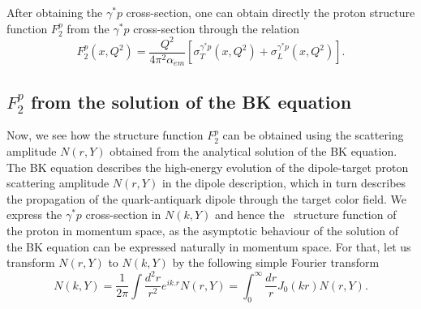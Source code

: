 \documentclass[12pt]{article}
\begin{document}
After obtaining the $\gamma^{\ast}p$ cross-section, one can obtain directly the proton structure function $F_2 ^p$ from the $\gamma^{\ast}p$ cross-section through the relation
\begin{equation}
	F_2 ^p (x,Q^2) = \frac{Q^2}{4 \pi^2 \alpha_{em}} \left[\sigma^{\gamma^{\ast}p} _T (x, Q^2) + \sigma^{\gamma^{\ast}p} _L (x, Q^2)\right].
\end{equation}

\subsection{$F_2 ^p$ from the solution of the BK equation}
Now, we see how the structure function $F_2 ^ p$ can be obtained using the scattering amplitude $N(r,Y)$ obtained from the analytical solution of the BK equation. The BK equation describes the high-energy evolution of the dipole-target proton scattering amplitude $N(r,Y)$ in the dipole description, which in turn describes the propagation of the quark-antiquark dipole through the target color field. We express the $\gamma^{\ast}p$ cross-section in $N(k,Y)$ and hence the  structure function of the proton in momentum space, as the asymptotic behaviour of the solution of the BK equation can be expressed naturally in momentum space. For that, let us transform $N(r,Y)$ to $N(k,Y)$ by the following simple Fourier transform 
\begin{equation}
	N(k,Y) = \frac{1}{2\pi}\int \frac{d^2 r}{r^2} e^{i{k.r}} N(r,Y) = \int_{0} ^{\infty} \frac{dr}{r} J_0 (kr) N(r,Y).
\end{equation}
\end{document}
